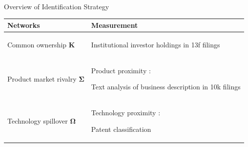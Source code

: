 \documentclass[
  aspectratio=169,  %
]{beamer}
\theoremstyle{plain}
\begin{document}
\begin{frame}{Overview of Identification Strategy}
  \label{identification_overview} %
  \begin{center}
        \renewcommand{\arraystretch}{1.5} %
        \begin{tabular}{lV{\linewidth}}
          Networks                              & Measurement\tabularnewline
          \hline\hline
          Common ownership $\symbf{K}$         & Institutional investor holdings in 13f filings
          
          \citep{Backus2021-yt} \tabularnewline
          \hline
          Product market rivalry $\symbf{\Sigma}$ & Product proximity \citep{Hoberg2016-jm}:

          Text analysis of business description in 10k filings \tabularnewline
          \hline
          Technology spillover $\symbf{\Omega}$   & Technology proximity \citep{Jaffe1986-yz,Bloom2013-pn}:

          Patent classification\tabularnewline
        \end{tabular}
        \renewcommand{\arraystretch}{1.0} %
        \par\end{center}
\end{frame}
\end{document}
